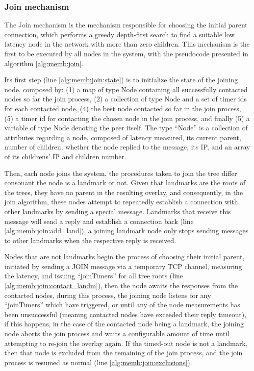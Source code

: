 \subsubsection{Join mechanism}

The Join mechanism is the mechanism responsible for choosing the initial parent connection, which performs a greedy depth-first search to find a suitable low latency node in the network with more than zero children. This mechanism is the first to be executed by all nodes in the system, with the pseudocode presented in algorithm \ref{alg:memb:join}. 



Its first step (line \ref{alg:memb:join:state}) is to initialize the state of the joining node, composed by: (1) a map of type Node containing all successfully contacted nodes so far the join process, (2) a collection of type Node and a set of timer ids for each contacted node, (4) the best node contacted so far in the join process, (5) a timer id for contacting the chosen node in the join process, and finally (5) a variable of type Node denoting the peer itself. The type ``Node'' is a collection of attributes regarding a node, composed of latency measured, its current parent, number of children, whether the node replied to the message, its IP, and an array of its childrens' IP and children number.

Then, each node joins the system, the procedures taken to join the tree differ consonant the node is a landmark or not. Given that landmarks are the roots of the trees, they have no parent in the resulting overlay, and consequently, in the join algorithm, these nodes attempt to repeatedly establish a connection with other landmarks by sending a special message. Landmarks that receive this message will send a reply and establish a connection back (line \ref{alg:memb:join:add_land}), a joining landmark node only stops sending messages to other landmarks when the respective reply is received.

Nodes that are not landmarks begin the process of choosing their initial parent, initiated by sending a JOIN message via a temporary TCP channel, measuring the latency, and issuing ``joinTimers'' for all tree roots (line \ref{alg:memb:join:contact_landm}), then the node awaits the responses from the contacted nodes, during this process, the joining node listens for any ``joinTimers'' which have triggered, or until any of the node measurements has been unsuccessful (meaning contacted nodes have exceeded their reply timeout), if this happens, in the case of the contacted node being a landmark, the joining node aborts the join process and waits a configurable amount of time until attempting to re-join the overlay again. If the timed-out node is not a landmark, then that node is excluded from the remaining of the join process, and the join process is resumed as normal (line \ref{alg:memb:join:exclusions}).

